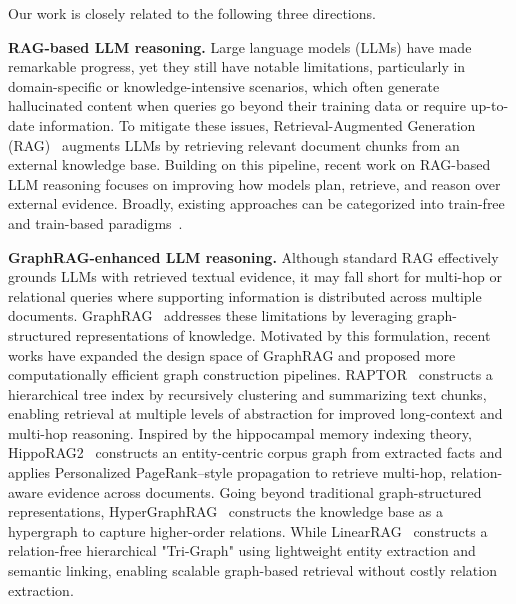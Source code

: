 Our work is closely related to the following three directions.

\noindent \textbf{RAG-based LLM reasoning.}
Large language models (LLMs) have made remarkable progress, yet they still have notable limitations, particularly in domain-specific or knowledge-intensive scenarios, which often generate hallucinated content when queries go beyond their training data or require up-to-date information. To mitigate these issues, Retrieval-Augmented Generation (RAG)~\cite{lewis2021rag} augments LLMs by retrieving relevant document chunks from an external knowledge base. Building on this pipeline, recent work on RAG-based LLM reasoning focuses on improving how models plan, retrieve, and reason over external evidence. Broadly, existing approaches can be categorized into train-free~\cite{he2024retrievingrethinkingrevisingchainofverification, zhang2025arise} and train-based paradigms~\cite{wang2025kblam, islam2024openrag, zhang2024raftadaptinglanguagemodel}. 

\noindent \textbf{GraphRAG-enhanced LLM reasoning.}
Although standard RAG effectively grounds LLMs with retrieved textual evidence, it may fall short for multi-hop or relational queries where supporting information is distributed across multiple documents. GraphRAG~\cite{edge2024local} addresses these limitations by leveraging graph-structured representations of knowledge. Motivated by this formulation, recent works have expanded the design space of GraphRAG and proposed more computationally efficient graph construction pipelines. RAPTOR~\cite{sarthi2024raptor} constructs a hierarchical tree index by recursively clustering and summarizing text chunks, enabling retrieval at multiple levels of abstraction for improved long-context and multi-hop reasoning. Inspired by the hippocampal memory indexing theory, HippoRAG2~\cite{gutiérrez2025hipporag2} constructs an entity-centric corpus graph from extracted facts and applies Personalized PageRank–style propagation to retrieve multi-hop, relation-aware evidence across documents. Going beyond traditional graph-structured representations, HyperGraphRAG~\cite{luo2025hypergraphrag} constructs the knowledge base as a hypergraph to capture higher-order relations. While LinearRAG~\cite{zhuang2025linearrag} constructs a relation-free hierarchical "Tri-Graph" using lightweight entity extraction and semantic linking, enabling scalable graph-based retrieval without costly relation extraction.

